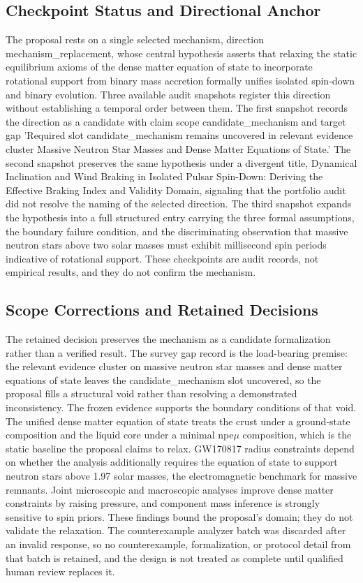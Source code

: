 \documentclass[conference]{IEEEtran}
\begin{document}
\subsection{Checkpoint Status and Directional Anchor}
The proposal rests on a single selected mechanism, direction mechanism\_replacement, whose central hypothesis asserts that relaxing the static equilibrium axioms of the dense matter equation of state to incorporate rotational support from binary mass accretion formally unifies isolated spin-down and binary evolution. Three available audit snapshots register this direction without establishing a temporal order between them. The first snapshot records the direction as a candidate with claim scope candidate\_mechanism and target gap 'Required slot candidate\_mechanism remains uncovered in relevant evidence cluster Massive Neutron Star Masses and Dense Matter Equations of State.' The second snapshot preserves the same hypothesis under a divergent title, Dynamical Inclination and Wind Braking in Isolated Pulsar Spin-Down: Deriving the Effective Braking Index and Validity Domain, signaling that the portfolio audit did not resolve the naming of the selected direction. The third snapshot expands the hypothesis into a full structured entry carrying the three formal assumptions, the boundary failure condition, and the discriminating observation that massive neutron stars above two solar masses must exhibit millisecond spin periods indicative of rotational support. These checkpoints are audit records, not empirical results, and they do not confirm the mechanism.

\subsection{Scope Corrections and Retained Decisions}
The retained decision preserves the mechanism as a candidate formalization rather than a verified result. The survey gap record is the load-bearing premise: the relevant evidence cluster on massive neutron star masses and dense matter equations of state leaves the candidate\_mechanism slot uncovered, so the proposal fills a structural void rather than resolving a demonstrated inconsistency. The frozen evidence supports the boundary conditions of that void. The unified dense matter equation of state treats the crust under a ground-state composition and the liquid core under a minimal npe$\mu$ composition, which is the static baseline the proposal claims to relax. GW170817 radius constraints depend on whether the analysis additionally requires the equation of state to support neutron stars above 1.97 solar masses, the electromagnetic benchmark for massive remnants. Joint microscopic and macroscopic analyses improve dense matter constraints by raising pressure, and component mass inference is strongly sensitive to spin priors. These findings bound the proposal's domain; they do not validate the relaxation. The counterexample analyzer batch was discarded after an invalid response, so no counterexample, formalization, or protocol detail from that batch is retained, and the design is not treated as complete until qualified human review replaces it.~\cite{cite_55957f4ce67bd972,cite_42e341ff6471ce89}
\end{document}
